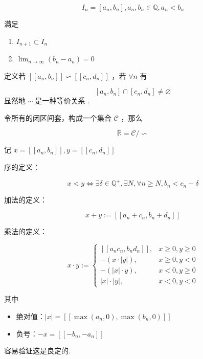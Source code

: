 \begin{construction}[用Cantor闭区间套从有理数构建$\R$]
	
	$$
	I_n=\left[a_n, b_n\right] , a_n, b_n \in \mathbb{Q}, a_n<b_n
	$$
	
	
	满足
	\begin{enumerate}
		\item $I_{n+1} \subset I_n$
		\item $\lim _{n \rightarrow \infty}\left(b_n-a_n\right)=0$
	\end{enumerate}
	定义若 $[[a_n, b_n]] \backsim[[c_n, d_n]] $ ，若 $\forall n $ 有
	
	$$
	\left[a_n, b_n\right] \cap\left[c_n, d_n\right] \neq \varnothing
	$$
	显然地$\backsim$是一种等价关系
	.
	
	令所有的闭区间套，构成一个集合 $\mathscr{C}$ ，那么
	
	$$
	\mathbb{R}=\mathscr{C}/\backsim
	$$
	
	记 $x=\left[\left[a_n, b_n\right]\right], y=\left[\left[c_n, d_n\right]\right]$
	
	序的定义：
	
	$$
	x<y \Longleftrightarrow \exists \delta \in \mathbb{Q}^{+}, \exists N, \forall n \geqslant N, b_n<c_n-\delta
	$$
	
	加法的定义：
	
	$$x+y:=\left[\left[a_n+c_n, b_n+d_n\right]\right]$$
	
	乘法的定义：
	
	$$x \cdot y:= \begin{cases}{\left[\left[a_n c_n, b_n d_n\right]\right],} & x \geqslant 0, y \geqslant 0 \\ -(x \cdot|y|), & x \geqslant 0, y<0 \\ -(|x| \cdot y), & x<0, y \geqslant 0 \\ |x| \cdot|y|, & x<0, y<0\end{cases}$$
	
	其中
	\begin{itemize}
		\item 绝对值：$|x|=\left[\left[\max \left(a_n, 0\right), \max \left(b_n, 0\right)\right]\right]$
		\item 负号：$-x=\left[\left[-b_n,-a_n\right]\right]$
	\end{itemize}
	容易验证这是良定的.
	
\end{construction}
